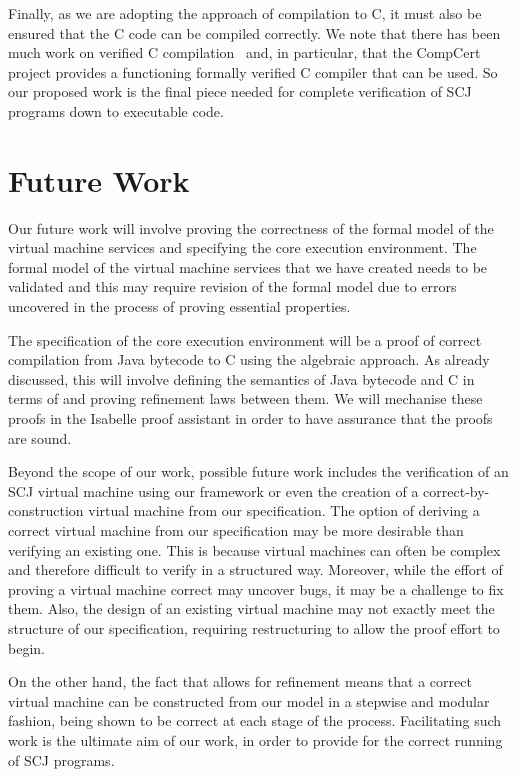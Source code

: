 \documentclass[a4paper,10pt]{report}
\begin{document}
Finally, as we are adopting the approach of compilation to C, it must
also be ensured that the C code can be compiled correctly.
We note that there has been much work on verified C
compilation~\cite{leroy2009a, leroy2009b, leroy2012, leinenbach2005,
  blazy2006} and, in particular, that the CompCert project provides a
functioning formally verified C compiler that can be used.
So our proposed work is the final piece needed for complete
verification of SCJ programs down to executable code.

\section{Future Work}
\label{future-work-section}

Our future work will involve proving the correctness of the formal
model of the virtual machine services and specifying the core
execution environment.
The formal model of the virtual machine services that we have created
needs to be validated and this may require revision of the formal
model due to errors uncovered in the process of proving essential
properties.

The specification of the core execution environment will be a proof of
correct compilation from Java bytecode to C using the algebraic
approach.
As already discussed, this will involve defining the semantics of Java
bytecode and C in terms of \Circus{} and proving refinement laws
between them.
We will mechanise these proofs in the Isabelle proof assistant in
order to have assurance that the proofs are sound.

Beyond the scope of our work, possible future work includes the
verification of an SCJ virtual machine using our framework or even the
creation of a correct-by-construction virtual machine from our
specification.
The option of deriving a correct virtual machine from our
specification may be more desirable than verifying an existing one.
This is because virtual machines can often be complex and therefore
difficult to verify in a structured way.
Moreover, while the effort of proving a virtual machine correct may
uncover bugs, it may be a challenge to fix them.
Also, the design of an existing virtual machine may not exactly meet
the structure of our specification, requiring restructuring to allow
the proof effort to begin.

On the other hand, the fact that \Circus{} allows for refinement means
that a correct virtual machine can be constructed from our model in a
stepwise and modular fashion, being shown to be correct at each stage
of the process.
Facilitating such work is the ultimate aim of our work, in order to
provide for the correct running of SCJ programs.

\raggedright \printbibliography
\end{document}
